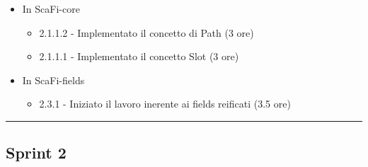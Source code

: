 \documentclass[12pt, a4paper]{article}
\begin{document}
\begin{itemize}
\begin{itemize}
                    \color{cyan}
              \item In ScaFi-core
                    \begin{itemize}
                        \item 2.1.1.2 - Implementato il concetto di Path (3 ore)
                        \item 2.1.1.1 - Implementato il concetto Slot (3 ore)
                    \end{itemize}
                    \color{blue}
              \item In ScaFi-fields
                    \begin{itemize}
                        \item 2.3.1 - Iniziato il lavoro inerente ai fields reificati (3.5 ore)
                    \end{itemize}
          \end{itemize}
\end{itemize}

\par\noindent\rule{\textwidth}{0.5pt}

\subsection*{Sprint 2}
\end{document}
